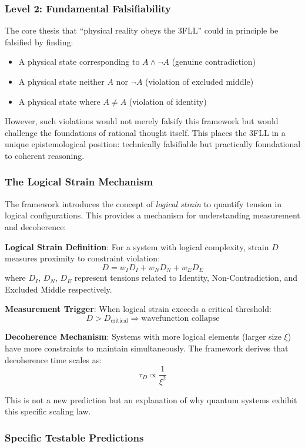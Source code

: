 \documentclass[12pt,a4paper]{article}
\begin{document}
\subsubsection{Level 2: Fundamental Falsifiability}

The core thesis that ``physical reality obeys the 3FLL'' could in principle be falsified by finding:
\begin{itemize}
\item A physical state corresponding to $A \land \neg A$ (genuine contradiction)
\item A physical state neither $A$ nor $\neg A$ (violation of excluded middle)
\item A physical state where $A \neq A$ (violation of identity)
\end{itemize}

However, such violations would not merely falsify this framework but would challenge the foundations of rational thought itself. This places the 3FLL in a unique epistemological position: technically falsifiable but practically foundational to coherent reasoning.

\subsubsection{The Logical Strain Mechanism}

The framework introduces the concept of \textit{logical strain} to quantify tension in logical configurations. This provides a mechanism for understanding measurement and decoherence:

\textbf{Logical Strain Definition}: For a system with logical complexity, strain $D$ measures proximity to constraint violation:
$$D = w_I D_I + w_N D_N + w_E D_E$$
where $D_I$, $D_N$, $D_E$ represent tensions related to Identity, Non-Contradiction, and Excluded Middle respectively.

\textbf{Measurement Trigger}: When logical strain exceeds a critical threshold:
$$D > D_{\text{critical}} \Rightarrow \text{wavefunction collapse}$$

\textbf{Decoherence Mechanism}: Systems with more logical elements (larger size $\xi$) have more constraints to maintain simultaneously. The framework derives that decoherence time scales as:
$$\tau_D \propto \frac{1}{\xi^2}$$

This is not a new prediction but an explanation of why quantum systems exhibit this specific scaling law.

\subsubsection{Specific Testable Predictions}
\end{document}
